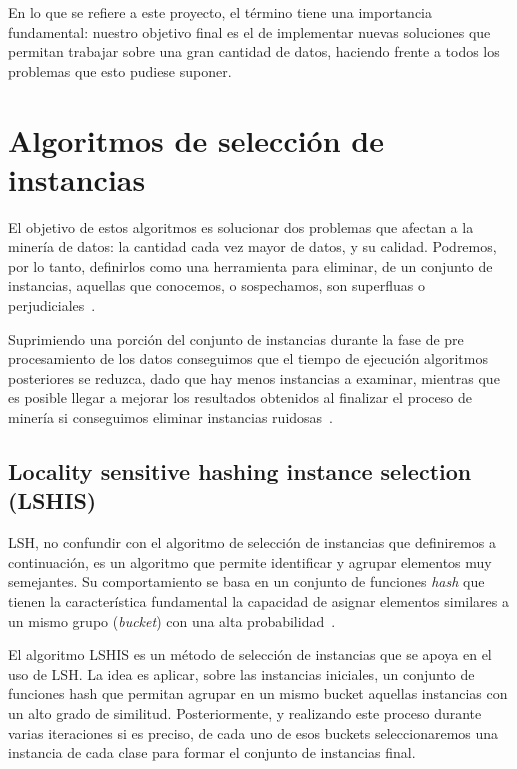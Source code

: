 En lo que se refiere a este proyecto, el término tiene una importancia fundamental: nuestro objetivo final es el de implementar nuevas soluciones que permitan trabajar sobre una gran cantidad de datos, haciendo frente a todos los problemas que esto pudiese suponer.

\section{Algoritmos de selección de instancias}\label{sec:DefAlgSel}

El objetivo de estos algoritmos es solucionar dos problemas que afectan a la minería de datos: la cantidad cada vez mayor de datos, y su calidad. Podremos, por lo tanto,  definirlos como una herramienta para eliminar, de un conjunto de instancias, aquellas que conocemos, o sospechamos, son superfluas o perjudiciales~\cite{IntroInstanceSelect}.

Suprimiendo una porción del conjunto de instancias durante la fase de pre procesamiento de los datos conseguimos que el tiempo de ejecución algoritmos posteriores se reduzca, dado que hay menos instancias a examinar, mientras que es posible llegar a mejorar los resultados obtenidos al finalizar el proceso de minería si conseguimos eliminar instancias ruidosas~\cite{IntroInstanceSelect}.

\subsection{Locality sensitive hashing instance selection (LSHIS)}\label{sec:defLSHIS}

LSH, no confundir con el algoritmo de selección de instancias que definiremos a continuación, es un algoritmo que permite identificar y agrupar elementos muy semejantes. Su comportamiento se basa en un conjunto de funciones \textit{hash} que tienen la característica fundamental la capacidad de asignar elementos similares a un mismo grupo (\textit{bucket}) con una alta probabilidad~\cite{LSHISPaper}.

El algoritmo LSHIS es un método de selección de instancias que se apoya en el uso de LSH. La idea es aplicar, sobre las instancias iniciales, un conjunto de funciones hash que permitan agrupar en un mismo bucket aquellas instancias con un alto grado de similitud. Posteriormente, y realizando este proceso durante varias iteraciones si es preciso, de cada uno de esos buckets seleccionaremos una instancia de cada clase para formar el conjunto de instancias final. 

